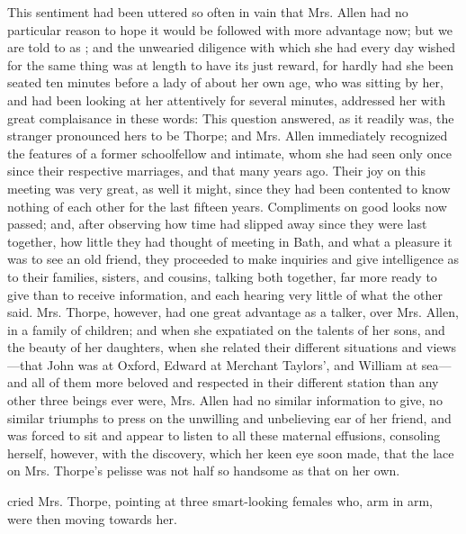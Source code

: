 This sentiment had been uttered so often in vain that Mrs. Allen had no particular reason to hope it would be followed with more advantage now; but we are told to  as ; and the unwearied diligence with which she had every day wished for the same thing was at length to have its just reward, for hardly had she been seated ten minutes before a lady of about her own age, who was sitting by her, and had been looking at her attentively for several minutes, addressed her with great complaisance in these words:  This question answered, as it readily was, the stranger pronounced hers to be Thorpe; and Mrs. Allen immediately recognized the features of a former schoolfellow and intimate, whom she had seen only once since their respective marriages, and that many years ago. Their joy on this meeting was very great, as well it might, since they had been contented to know nothing of each other for the last fifteen years. Compliments on good looks now passed; and, after observing how time had slipped away since they were last together, how little they had thought of meeting in Bath, and what a pleasure it was to see an old friend, they proceeded to make inquiries and give intelligence as to their families, sisters, and cousins, talking both together, far more ready to give than to receive information, and each hearing very little of what the other said. Mrs. Thorpe, however, had one great advantage as a talker, over Mrs. Allen, in a family of children; and when she expatiated on the talents of her sons, and the beauty of her daughters, when she related their different situations and views---that John was at Oxford, Edward at Merchant Taylors', and William at sea---and all of them more beloved and respected in their different station than any other three beings ever were, Mrs. Allen had no similar information to give, no similar triumphs to press on the unwilling and unbelieving ear of her friend, and was forced to sit and appear to listen to all these maternal effusions, consoling herself, however, with the discovery, which her keen eye soon made, that the lace on Mrs. Thorpe's pelisse was not half so handsome as that on her own.

 cried Mrs. Thorpe, pointing at three smart-looking females who, arm in arm, were then moving towards her. 

